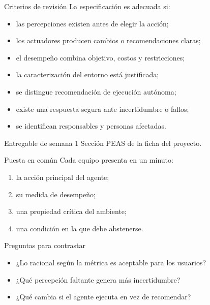 \documentclass[aspectratio=169,11pt]{beamer}
\begin{document}
\begin{frame}{Criterios de revisión}
  La especificación es adecuada si:
  \begin{itemize}
    \item las percepciones existen antes de elegir la acción;
    \item los actuadores producen cambios o recomendaciones claras;
    \item el desempeño combina objetivo, costos y restricciones;
    \item la caracterización del entorno está justificada;
    \item se distingue recomendación de ejecución autónoma;
    \item existe una respuesta segura ante incertidumbre o fallos;
    \item se identifican responsables y personas afectadas.
  \end{itemize}
  \begin{block}{Entregable de semana 1}
    Sección PEAS de la ficha del proyecto.
  \end{block}
\end{frame}

\begin{frame}{Puesta en común}
  Cada equipo presenta en un minuto:
  \begin{enumerate}
    \item la acción principal del agente;
    \item su medida de desempeño;
    \item una propiedad crítica del ambiente;
    \item una condición en la que debe abstenerse.
  \end{enumerate}
  \begin{block}{Preguntas para contrastar}
    \begin{itemize}
      \item ¿Lo racional según la métrica es aceptable para los usuarios?
      \item ¿Qué percepción faltante genera más incertidumbre?
      \item ¿Qué cambia si el agente ejecuta en vez de recomendar?
    \end{itemize}
  \end{block}
\end{frame}
\end{document}
